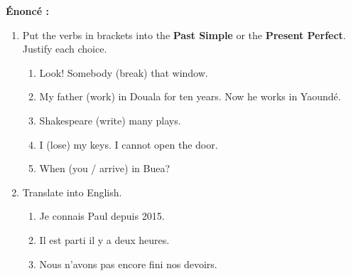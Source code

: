 \documentclass[11pt]{article}
\begin{document}
\begin{exoresolu}
\textbf{Énoncé :}
\begin{enumerate}
    \item Put the verbs in brackets into the \textbf{Past Simple} or the \textbf{Present Perfect}. Justify each choice.
    \begin{enumerate}
        \item Look! Somebody (break) that window.
        \item My father (work) in Douala for ten years. Now he works in Yaoundé.
        \item Shakespeare (write) many plays.
        \item I (lose) my keys. I cannot open the door.
        \item When (you / arrive) in Buea?
    \end{enumerate}
    \item Translate into English.
    \begin{enumerate}
        \item Je connais Paul depuis 2015.
        \item Il est parti il y a deux heures.
        \item Nous n'avons pas encore fini nos devoirs.
    \end{enumerate}
\end{enumerate}


\end{exoresolu}
\end{document}
